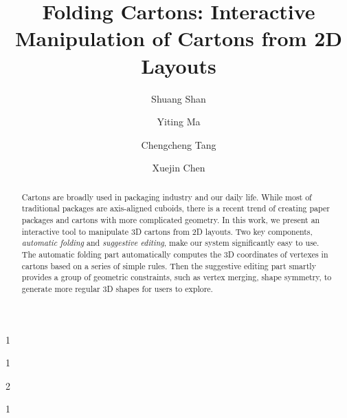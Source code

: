 \documentclass[submission]{gmp2018}
\begin{document}
%
%
\title{Folding Cartons: Interactive Manipulation of Cartons from 2D Layouts}

%
%

%
%
\author{Shuang Shan}{1}
\author{Yiting Ma}{1}
\author{Chengcheng Tang}{2}
\author{Xuejin Chen}{1}

%
%

%
%
 



\newcommand{\comments}[1]{}
\newcommand{\cxj}[1]{\textcolor{red}{(xuejin:#1)}}
\newcommand{\xjmd}[1]{\textcolor{purple}{#1}}
\newcommand{\vo}{\hat{\mathbf{v}}}
\newcommand{\vn}{\mathbf{v}}
\newcommand{\vset}{\mathbb{V}}


\maketitle

\begin{abstract}
Cartons are broadly used in packaging industry and our daily life. While most of traditional packages are axis-aligned cuboids, there is a recent trend of creating paper packages and cartons with more complicated geometry. In this work, we present an interactive tool to manipulate 3D cartons from 2D layouts. Two key components, \emph{automatic folding} and \emph{suggestive editing}, make our system significantly easy to use. 
The automatic folding part automatically computes the 3D coordinates of vertexes in cartons based on a series of simple rules. Then the suggestive editing part smartly provides a group of geometric constraints, such as vertex merging, shape symmetry, to generate more regular 3D shapes for users to explore.
{\color{blue}{Moreover, users are allowed to edit the shape of 3D model, and refine the 2D layout automatically.}}
\end{abstract}
\end{document}
